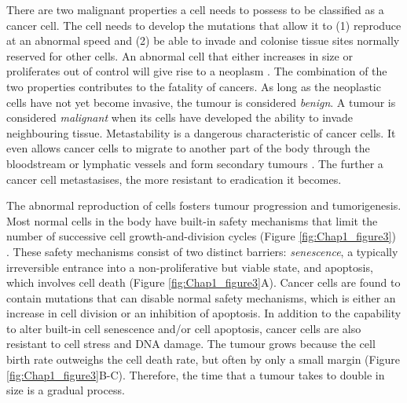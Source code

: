 There are two malignant properties a cell needs to possess to be classified as a cancer cell. The cell needs to develop the mutations that allow it to (1) reproduce at an abnormal speed and (2) be able to invade and colonise tissue sites normally reserved for other cells. An abnormal cell that either increases in size or proliferates out of control will give rise to a neoplasm \cite{alberts2018molecular, hanahan2000hallmarks}. The combination of the two properties contributes to the fatality of cancers. As long as the neoplastic cells have not yet become invasive, the tumour is considered \textit{benign}. A tumour is considered \textit{malignant} when its cells have developed the ability to invade neighbouring tissue. Metastability is a dangerous characteristic of cancer cells. It even allows cancer cells to migrate to another part of the body through the bloodstream or lymphatic vessels and form secondary tumours \cite{alberts2018molecular}. The further a cancer cell metastasises, the more resistant to eradication it becomes.   

The abnormal reproduction of cells fosters tumour progression and tumorigenesis. Most normal cells in the body have built-in safety mechanisms that limit the number of successive cell growth-and-division cycles (Figure \ref{fig:Chap1_figure3}) \cite{hanahan2000hallmarks, hanahan2011hallmarksnext}. These safety mechanisms consist of two distinct barriers: \textit{senescence}, a typically irreversible entrance into a non-proliferative but viable state, and apoptosis, which involves cell death (Figure \ref{fig:Chap1_figure3}A). Cancer cells are found to contain mutations that can disable normal safety mechanisms, which is either an increase in cell division or an inhibition of apoptosis. In addition to the capability to alter built-in cell senescence and/or cell apoptosis, cancer cells are also resistant to cell stress and DNA damage. The tumour grows because the cell birth rate outweighs the cell death rate, but often by only a small margin (Figure \ref{fig:Chap1_figure3}B-C). Therefore, the time that a tumour takes to double in size is a gradual process.

